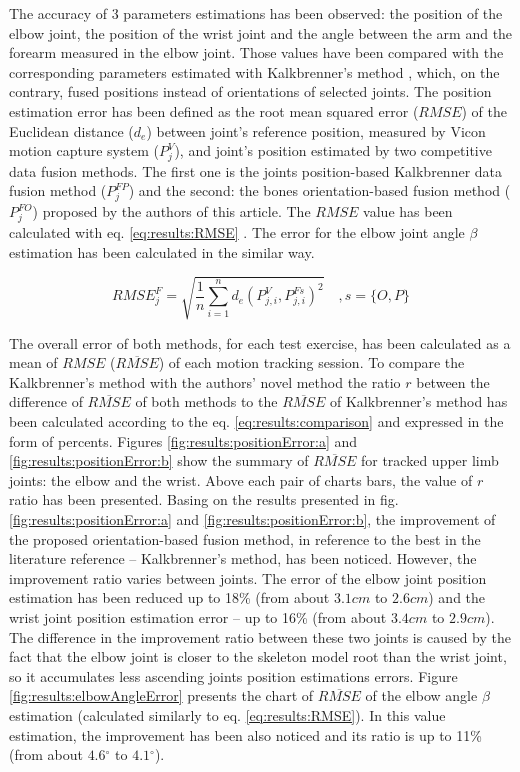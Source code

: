 \documentclass[sensors,article,submit,moreauthors,pdftex,10pt,a4paper]{mdpi}
\newcommand{\degree}{\ensuremath{{}^{\circ}}\xspace}
\begin{document}
The accuracy of 3 parameters estimations has been observed: the position of the elbow joint, the position of the wrist joint and the angle between the arm and the forearm measured in the elbow joint. Those values have been compared with the corresponding parameters estimated with Kalkbrenner’s method \cite{Kalkbrenner2014}, which, on the contrary, fused positions instead of orientations of selected joints. The position estimation error has been defined as the root mean squared error ($RMSE$) of the Euclidean distance ($d_e$) between joint’s reference position, measured by Vicon motion capture system ($P_j^V$), and joint’s position estimated by two competitive data fusion methods. The first one is the joints position-based Kalkbrenner data fusion method ($P_j^{FP}$) and the second: the bones orientation-based fusion method ($P_j^{FO}$) proposed by the authors of this article. The $RMSE$ value has been calculated with eq. \ref{eq:results:RMSE} \cite{Armstrong1992}. The error for the elbow joint angle $\beta$ estimation has been calculated in the similar way.
		
\begin{equation}
	{RMSE}^F_j = \sqrt{\frac{1}{n}\sum_{i=1}^{n}{d_e(P^V_{j,i}, P^{Fs}_{j,i})^2}}\quad , s = \{O,P\}
	\label{eq:results:RMSE}
\end{equation}
		
The overall error of both methods, for each test exercise, has been calculated as a mean of $RMSE$ ($\overline{RMSE}$) of each motion tracking session. To compare the Kalkbrenner’s method with the authors’ novel method the ratio $r$ between the difference of $\overline{RMSE}$ of both methods to the $\overline{RMSE}$ of Kalkbrenner’s method has been calculated according to the eq. \ref{eq:results:comparison} and expressed in the form of percents. Figures \ref{fig:results:positionError:a} and \ref{fig:results:positionError:b} show the summary of  $\overline{RMSE}$ for tracked upper limb joints: the elbow and the wrist. Above each pair of charts bars, the value of $r$ ratio has been presented. Basing on the results presented in fig. \ref{fig:results:positionError:a} and \ref{fig:results:positionError:b}, the improvement of the proposed orientation-based fusion method, in reference to the best in the literature reference -- Kalkbrenner’s method, has been noticed. However, the improvement ratio varies between joints. The error of the elbow joint position estimation has been reduced up to 18\% (from about $3.1cm$ to $2.6cm$) and the wrist joint position estimation error -- up to 16\% (from about $3.4cm$ to $2.9cm$). The difference in the improvement ratio between these two joints is caused by the fact that the elbow joint is closer to the skeleton model root than the wrist joint, so it accumulates less ascending joints position estimations errors. Figure \ref{fig:results:elbowAngleError} presents the chart of $\overline{RMSE}$ of the elbow angle $\beta$ estimation (calculated similarly to eq. \ref{eq:results:RMSE}). In this value estimation, the improvement has been also noticed and its ratio is up to 11\% (from about $4.6\degree$ to $4.1\degree$).
		
\end{document}
